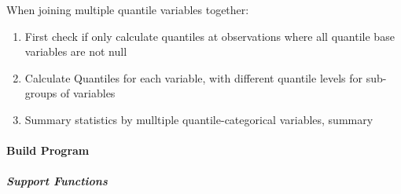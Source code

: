 \documentclass[
]{article}
\providecommand{\tightlist}{%
  \setlength{\itemsep}{0pt}\setlength{\parskip}{0pt}}
\begin{document}
When joining multiple quantile variables together:

\begin{enumerate}
\def\labelenumi{\arabic{enumi}.}
\tightlist
\item
  First check if only calculate quantiles at observations where all
  quantile base variables are not null
\item
  Calculate Quantiles for each variable, with different quantile levels
  for sub-groups of variables
\item
  Summary statistics by mulltiple quantile-categorical variables,
  summary
\end{enumerate}

\hypertarget{build-program}{%
\paragraph{Build Program}\label{build-program}}

\hypertarget{support-functions}{%
\subparagraph{Support Functions}\label{support-functions}}
\end{document}
